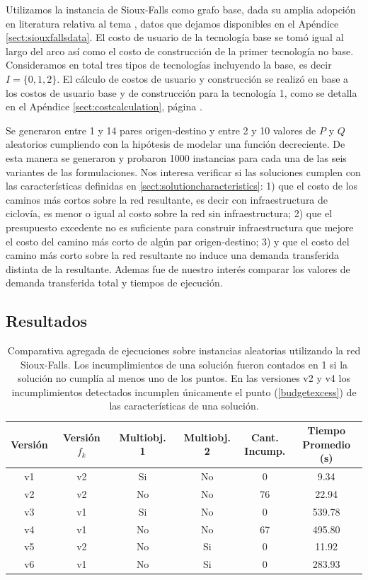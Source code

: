 Utilizamos la instancia de Sioux-Falls como grafo base, dada su amplia adopción en literatura relativa al tema \cite{Liu2019}, datos que dejamos disponibles en el Apéndice \ref{sect:siouxfallsdata}. El costo de usuario de la tecnología base se tomó igual al largo del arco así como el costo de construcción de la primer tecnología no base. Consideramos en total tres tipos de tecnologías incluyendo la base, es decir $I = \{0, 1, 2\}$. El cálculo de costos de usuario y construcción se realizó en base a los costos de usuario base y de construcción para la tecnología 1, como se detalla en el Apéndice \ref{sect:costcalculation}, página \pageref{sect:costcalculation}.

Se generaron entre 1 y 14 pares origen-destino y entre 2 y 10 valores de $P$ y $Q$ aleatorios cumpliendo con la hipótesis de modelar una función decreciente.
De esta manera se generaron y probaron 1000 instancias para cada una de las seis variantes de las formulaciones. Nos interesa verificar si las soluciones cumplen con las características definidas en \ref{sect:solutioncharacteristics}: 1) que el costo de los caminos más cortos sobre la red resultante, es decir con infraestructura de ciclovía, es menor o igual al costo sobre la red sin infraestructura; 2) que el presupuesto excedente no es suficiente para construir infraestructura que mejore el costo del camino más corto de algún par origen-destino; 3) y que el costo del camino más corto sobre la red resultante no induce una demanda transferida distinta de la resultante. Ademas fue de nuestro interés comparar los valores de demanda transferida total y tiempos de ejecución.

\FloatBarrier
\subsection{Resultados}

\begin{table}[h!]
  \centering
  \begin{tabular}{cccccc}
    \toprule
    Versión & Versión $f_k$ & Multiobj. 1 & Multiobj. 2 & \shortstack{Cant. \\ Incump.} & \shortstack{Tiempo \\ Promedio (s)} \\
    \midrule
    v1 & v2 & Si & No & 0   & 9.34    \\
    v2 & v2 & No & No & 76  & 22.94   \\
    v3 & v1 & Si & No & 0   & 539.78  \\
    v4 & v1 & No & No & 67  & 495.80  \\
    v5 & v2 & No & Si & 0   & 11.92   \\
    v6 & v1 & No & Si & 0   & 283.93  \\
    \bottomrule
  \end{tabular}
  \caption{Comparativa agregada de ejecuciones sobre instancias aleatorias utilizando la red Sioux-Falls. Los incumplimientos de una solución fueron contados en 1 si la solución no cumplía al menos uno de los puntos. En las versiones v2 y v4 los incumplimientos detectados incumplen únicamente el punto (\ref{budgetexcess}) de las características de una solución.}\label{table:resumenejecuciones}
\end{table}

